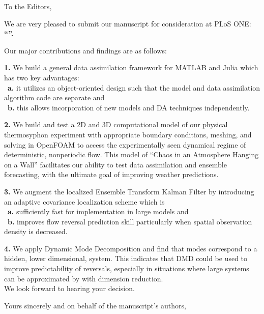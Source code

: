 
To the Editors,

We are very pleased to submit our manuscript for consideration at PLoS
ONE:\\
\textbf{``''.}

Our major contributions and findings are as follows:

\textbf{1.}
We build a general data assimilation framework for MATLAB and Julia which has two key advantages:\\
\mbox{}\ \textbf{a.} it utilizes an object-oriented design such that the model and data assimilation algorithm code are separate and\\
\mbox{}\ \textbf{b.} this allows incorporation of new models and DA techniques independently.

\textbf{2.}
We build and test a 2D and 3D computational model of our physical thermosyphon experiment with appropriate boundary conditions, meshing, and solving in OpenFOAM to access the experimentally seen dynamical regime of deterministic, nonperiodic flow.
This model of ``Chaos in an Atmosphere Hanging on a Wall'' facilitates our ability to test data assimilation and ensemble forecasting, with the ultimate goal of improving weather predictions.

\textbf{3.}
We augment the localized Ensemble Transform Kalman Filter by introducing an adaptive covariance localization scheme which is\\
\mbox{}\ \textbf{a.} sufficiently fast for implementation in large models and\\
\mbox{}\ \textbf{b.} improves flow reversal prediction skill particularly when spatial observation density is decreased.

\textbf{4.}
We apply Dynamic Mode Decomposition and find that modes correspond to a hidden, lower dimensional, system.
This indicates that DMD could be used to improve predictability of reversals, especially in situations where large systems can be approximated by with dimension reduction.\\

We look forward to hearing your decision.

Yours sincerely and on behalf of the manuscript's authors,


